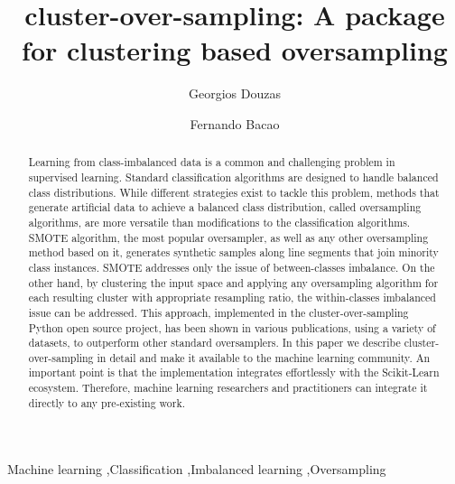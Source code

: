 \documentclass[preprint,12pt, a4paper]{elsarticle}
\begin{document}
\begin{frontmatter}

\title{cluster-over-sampling: A package for clustering based oversampling}

\author{Georgios Douzas}

\author{Fernando Bacao}

\address{NOVA Information Management School, Universidade Nova de Lisboa}


\begin{abstract}
Learning from class-imbalanced data is a common and challenging problem in supervised learning. Standard classification algorithms are designed to handle balanced class distributions. While different strategies exist to tackle this problem, methods that generate artificial data to achieve a balanced class distribution, called oversampling algorithms, are more versatile than modifications to the classification algorithms. SMOTE algorithm, the most popular oversampler, as well as any other oversampling method based on it, generates synthetic samples along line segments that join minority class instances. SMOTE addresses only the issue of between-classes imbalance. On the other hand, by clustering the input space and applying any oversampling algorithm for each resulting cluster with appropriate resampling ratio, the within-classes imbalanced issue can be addressed. This approach, implemented in the cluster-over-sampling Python open source project, has been shown in various publications, using a variety of datasets, to outperform other standard oversamplers. In this paper we describe cluster-over-sampling in detail and make it available to the machine learning community. An important point is that the implementation integrates effortlessly with the Scikit-Learn ecosystem. Therefore, machine learning researchers and practitioners can integrate it directly to any pre-existing work.
\end{abstract}

\begin{keyword}
Machine learning \sep Classification \sep Imbalanced learning \sep Oversampling
\end{keyword}

\end{frontmatter}
\end{document}
